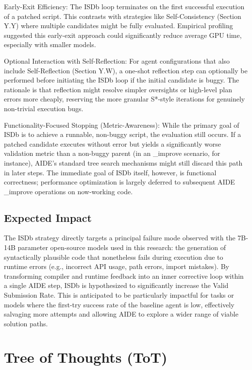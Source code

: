     Early-Exit Efficiency: The ISDb loop terminates on the first successful execution of a patched script. This contrasts with strategies like Self-Consistency (Section Y.Y) where multiple candidates might be fully evaluated. Empirical profiling suggested this early-exit approach could significantly reduce average GPU time, especially with smaller models.

    Optional Interaction with Self-Reflection: For agent configurations that also include Self-Reflection (Section Y.W), a one-shot reflection step can optionally be performed before initiating the ISDb loop if the initial candidate is buggy. The rationale is that reflection might resolve simpler oversights or high-level plan errors more cheaply, reserving the more granular S*-style iterations for genuinely non-trivial execution bugs.

    Functionality-Focused Stopping (Metric-Awareness): While the primary goal of ISDb is to achieve a runnable, non-buggy script, the evaluation still occurs. If a patched candidate executes without error but yields a significantly worse validation metric than a non-buggy parent (in an _improve scenario, for instance), AIDE's standard tree search mechanisms might still discard this path in later steps. The immediate goal of ISDb itself, however, is functional correctness; performance optimization is largely deferred to subsequent AIDE _improve operations on now-working code.

\subsection{Expected Impact}
The ISDb strategy directly targets a principal failure mode observed with the 7B-14B parameter open-source models used in this research: the generation of syntactically plausible code that nonetheless fails during execution due to runtime errors (e.g., incorrect API usage, path errors, import mistakes). By transforming compiler and runtime feedback into an inner corrective loop within a single AIDE step, ISDb is hypothesized to significantly increase the Valid Submission Rate. This is anticipated to be particularly impactful for tasks or models where the first-try success rate of the baseline agent is low, effectively salvaging more attempts and allowing AIDE to explore a wider range of viable solution paths.

\section{Tree of Thoughts (ToT)}
